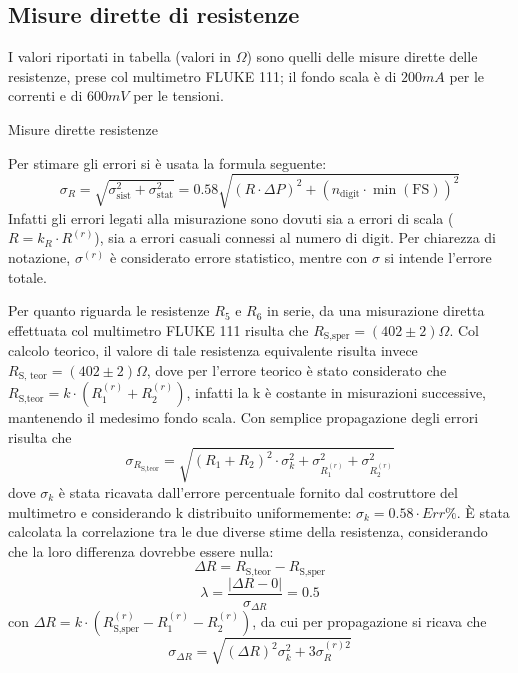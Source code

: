 
\subsection{Misure dirette di resistenze}
I valori riportati in tabella (valori in $\Omega$) sono quelli delle misure dirette delle resistenze, prese col multimetro FLUKE 111; il fondo scala \`e di $200mA$ per le correnti e di $600mV$ per le tensioni.

\begin{tabella}
	\centering
	
	\caption{Misure dirette resistenze}
	\label{tab:01_tab_1.tex}
\end{tabella}


Per stimare gli errori si \`e usata la formula seguente:
\[ \sigma_R =\sqrt{ \sigma_{\textrm{sist}}^2 + \sigma_{\textrm{stat}}^2}= 0.58 \sqrt{(R\cdot\Delta P)^2 + (n_{\textrm{digit}} \cdot \min(\textrm{FS}))^2}\]
Infatti gli errori legati alla misurazione sono dovuti sia a errori di scala ($ R= k _R \cdot R^{(r)} $), sia a errori casuali connessi al numero di digit. Per chiarezza di notazione, $\sigma^{(r)}$ \`e considerato errore statistico, mentre con $\sigma$ si intende l'errore totale.

Per quanto riguarda le resistenze $R_5$ e $R_6$ in serie, da una misurazione diretta effettuata col multimetro FLUKE 111 risulta che $R_{\textrm{S,sper}}= (402 \pm 2 )\Omega$. Col calcolo teorico, il valore di tale resistenza equivalente risulta invece $R_{\textrm{S, teor}}=(402 \pm 2 )\Omega$, dove per l'errore teorico \`e stato considerato che $R_{\textrm{S,teor}}=k\cdot(R_1^{(r)} + R_2^{(r)})$, infatti la k \`e costante in misurazioni successive, mantenendo il medesimo fondo scala. Con semplice propagazione degli errori risulta che 
\[\sigma_{R_{\textrm{S,teor}}}=\sqrt{(R_1+R_2)^2\cdot\sigma_k^2+\sigma_{R_1^{(r)}}^2+\sigma_{R_2^{(r)}}^2}\]
dove $\sigma_k$ \`e stata ricavata dall'errore percentuale fornito dal costruttore del multimetro e considerando k distribuito uniformemente:
\(\sigma_k=0.58 \cdot Err\%\). 
\`E stata calcolata la correlazione tra le due diverse stime della resistenza, considerando che la loro differenza dovrebbe essere nulla:
\[\Delta R = R_{\textrm{S,teor}} - {R_{\textrm{S,sper}}}\]
\[\lambda=\frac{\left|\Delta R - 0\right|}{\sigma_{\Delta R}}=0.5\]
con $\Delta R = k\cdot(R_{\textrm{S,sper}}^{(r)}-R_1^{(r)}-R_2^{(r)})$, da cui per propagazione si ricava che 
\[ \sigma_{\Delta R} = 
        \sqrt{ (\Delta R)^2 \sigma_k^2 + 3 \sigma_R^{(r) 2} }\]

